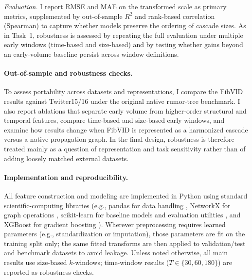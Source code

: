\emph{Evaluation.} I report RMSE and MAE on the transformed scale as primary metrics, supplemented by out-of-sample $R^2$ and rank-based correlation (Spearman) to capture whether models preserve the ordering of cascade sizes. As in Task~1, robustness is assessed by repeating the full evaluation under multiple early windows (time-based and size-based) and by testing whether gains beyond an early-volume baseline persist across window definitions.



\paragraph{Out-of-sample and robustness checks.}
To assess portability across datasets and representations, I compare the FibVID results against Twitter15/16 under the original native rumor-tree benchmark. I also report ablations that separate early volume from higher-order structural and temporal features, compare time-based and size-based early windows, and examine how results change when FibVID is represented as a harmonized cascade versus a native propagation graph. In the final design, robustness is therefore treated mainly as a question of representation and task sensitivity rather than of adding loosely matched external datasets.

\paragraph{Implementation and reproducibility.}
All feature construction and modeling are implemented in Python using standard scientific-computing libraries (e.g., pandas for data handling \citealp{mckinney_pandas_2010}, NetworkX for graph operations \citealp{hagberg_networkx_2008}, scikit-learn for baseline models and evaluation utilities \citealp{pedregosa_scikit_2011}, and XGBoost for gradient boosting \citealp{chen_xgboost_2016}). Wherever preprocessing requires learned parameters (e.g., standardization or imputation), those parameters are fit on the training split only; the same fitted transforms are then applied to validation/test and benchmark datasets to avoid leakage. Unless noted otherwise, all main results use size-based $k$-windows; time-window results ($T\in\{30,60,180\}$) are reported as robustness checks.
